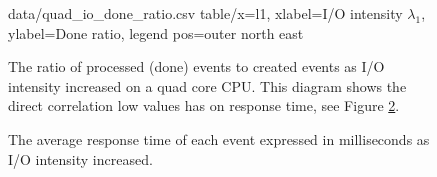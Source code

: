 \begin{figure}[h!]
    \centering
    \performanceplot
    {data/quad_io_done_ratio.csv}
    {table/x=l1, xlabel=I/O intensity $\lambda_1$, ylabel=Done ratio, legend pos=outer north east}
    \caption{The ratio of processed (done) events to created events as I/O
    intensity increased on a quad core CPU. This diagram shows the direct
    correlation low values has on response time, see
    Figure \ref{fig:io_avg_d0}.}
    \label{fig:quad_io_done_ratio}
\end{figure}

\begin{figure}[h!]
    \centering
    \caption{The average response time of each event expressed in milliseconds
    as I/O intensity increased.}
    \label{fig:io_avg_d0}
\end{figure}

